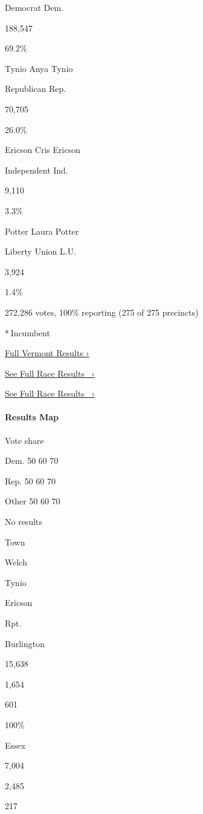 Democrat Dem.

188,547

69.2\%

 Tynio Anya Tynio

Republican Rep.

70,705

26.0\%

 Ericson Cris Ericson

Independent Ind.

9,110

3.3\%

 Potter Laura Potter

Liberty Union L.U.

3,924

1.4\%

272,286 votes, 100\% reporting (275 of 275 precincts)

* Incumbent

\href{https://www.nytimes3xbfgragh.onion/interactive/2018/11/06/us/elections/results-vermont-elections.html}{Full
Vermont Results ›}

\href{https://www.nytimes3xbfgragh.onion/elections/results/vermont-house-district-at-large}{See
Full Race Results~ ›}

\href{https://www.nytimes3xbfgragh.onion/elections/results/vermont-house-district-at-large}{See
Full Race Results~ ›}

\hypertarget{results-map-1}{%
\paragraph{Results Map}\label{results-map-1}}

Vote share

Dem. 50 60 70

Rep. 50 60 70

Other 50 60 70

No results

Town

Welch

Tynio

Ericson

Rpt.

Burlington

15,638

1,654

601

100\%

Essex

7,004

2,485

217


